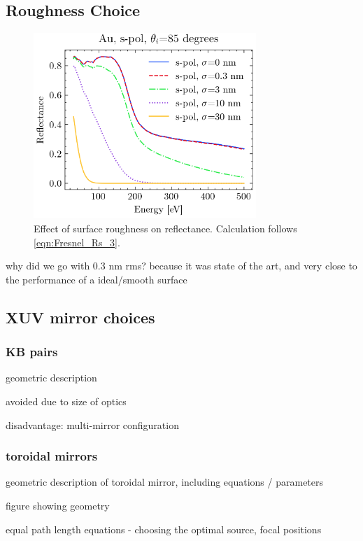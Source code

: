 \subsection{Roughness Choice}
\begin{figure}
	\centering
	\includegraphics[width=0.75\textwidth]{figures/chap2/R_vs_roughness.png}
	\caption{Effect of surface roughness on reflectance. Calculation follows \cref{eqn:Fresnel_Rs_3}.}
	\label{fig:R_vs_roughness.png}
\end{figure}

why did we go with 0.3 nm rms? because it was state of the art, and very close to the performance of a ideal/smooth surface

\subsection{XUV mirror choices}
\subsubsection{KB pairs}
geometric description

avoided due to size of optics

disadvantage: multi-mirror configuration

\subsubsection{toroidal mirrors}
geometric description of toroidal mirror, including equations / parameters

figure showing geometry

equal path length equations - choosing the optimal source, focal positions

